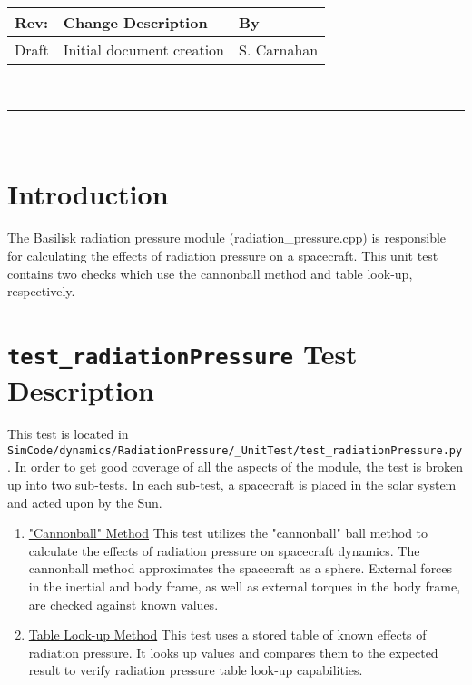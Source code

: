 \documentclass[]{BasiliskReportMemo}
\begin{document}
\makeCover


%
%
\pagestyle{empty}
{\renewcommand{\arraystretch}{1.1}
\noindent
\begin{longtable}{|p{0.5in}|p{4.5in}|p{1.14in}|}
\hline
{\bfseries Rev}: & {\bfseries Change Description} & {\bfseries By} \\
\hline
Draft & Initial document creation & S. Carnahan \\
\hline

\end{longtable}
}

\newpage
\setcounter{page}{1}
\pagestyle{fancy}

\tableofcontents
~\\ \hrule ~\\


\section{Introduction}
The Basilisk radiation pressure module (radiation\_pressure.cpp) is responsible for calculating the effects of radiation pressure on a spacecraft. This unit test contains two checks which use the cannonball method and table look-up, respectively.

\section{{\tt test\_radiationPressure} Test Description}

This test is located in {\tt SimCode/dynamics/RadiationPressure/\_UnitTest/test\_radiationPressure.py}. In order to get good coverage of all the aspects of the module, the test is broken up into two sub-tests. In each sub-test, a spacecraft is placed in the solar system and acted upon by the Sun. \par

\begin{enumerate}
	\item \underline{"Cannonball" Method} This test utilizes the "cannonball" ball method to calculate the effects of radiation pressure on spacecraft dynamics. The cannonball method approximates the spacecraft as a sphere. External forces in the inertial and body frame, as well as external torques in the body frame, are checked against known values.
	\item \underline{Table Look-up Method} This test uses a stored table of known effects of radiation pressure. It looks up values and compares them to the expected result to verify radiation pressure table look-up capabilities.
\end{enumerate} 
\end{document}
